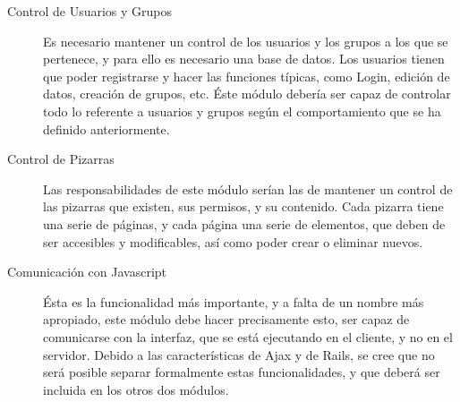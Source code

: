 \begin{description}
	\item[Control de Usuarios y Grupos] Es necesario mantener un control de los usuarios y los grupos a los que se pertenece, y para ello es necesario una base de datos. Los usuarios tienen que poder registrarse y hacer las funciones típicas, como Login, edición de datos, creación de grupos, etc. Éste módulo debería ser capaz de controlar todo lo referente a usuarios y grupos según el comportamiento que se ha definido anteriormente.
	\item[Control de Pizarras] Las responsabilidades de este módulo serían las de mantener un control de las pizarras que existen, sus permisos, y su contenido. Cada pizarra tiene una serie de páginas, y cada página una serie de elementos, que deben de ser accesibles y modificables, así como poder crear o eliminar nuevos.
	\item[Comunicación con Javascript] Ésta es la funcionalidad más importante, y a falta de un nombre más apropiado, este módulo debe hacer precisamente esto, ser capaz de comunicarse con la interfaz, que se está ejecutando en el cliente, y no en el servidor. Debido a las características de Ajax y de Rails, se cree que no será posible separar formalmente estas funcionalidades, y que deberá ser incluida en los otros dos módulos.
\end{description}